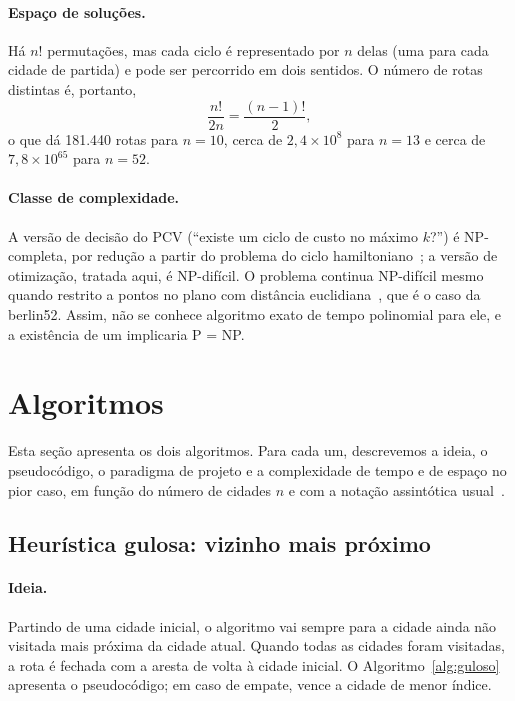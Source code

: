 \documentclass[12pt,a4paper]{article}
\begin{document}
\paragraph{Espaço de soluções.} Há $n!$ permutações, mas cada ciclo é representado por $n$ delas (uma para cada cidade de partida) e pode ser percorrido em dois sentidos. O número de rotas distintas é, portanto,
\[
  \frac{n!}{2n} = \frac{(n-1)!}{2},
\]
o que dá 181.440 rotas para $n = 10$, cerca de $2{,}4 \times 10^{8}$ para $n = 13$ e cerca de $7{,}8 \times 10^{65}$ para $n = 52$.

\paragraph{Classe de complexidade.} A versão de decisão do PCV (``existe um ciclo de custo no máximo $k$?'') é NP-completa, por redução a partir do problema do ciclo hamiltoniano~\cite{karp1972,garey1979}; a versão de otimização, tratada aqui, é NP-difícil. O problema continua NP-difícil mesmo quando restrito a pontos no plano com distância euclidiana~\cite{papadimitriou1977}, que é o caso da berlin52. Assim, não se conhece algoritmo exato de tempo polinomial para ele, e a existência de um implicaria P = NP.

\section{Algoritmos}\label{sec:algoritmos}

Esta seção apresenta os dois algoritmos. Para cada um, descrevemos a ideia, o pseudocódigo, o paradigma de projeto e a complexidade de tempo e de espaço no pior caso, em função do número de cidades $n$ e com a notação assintótica usual~\cite{cormen2009}.

\subsection{Heurística gulosa: vizinho mais próximo}\label{sec:guloso}

\paragraph{Ideia.} Partindo de uma cidade inicial, o algoritmo vai sempre para a cidade ainda não visitada mais próxima da cidade atual. Quando todas as cidades foram visitadas, a rota é fechada com a aresta de volta à cidade inicial. O Algoritmo~\ref{alg:guloso} apresenta o pseudocódigo; em caso de empate, vence a cidade de menor índice.
\end{document}
